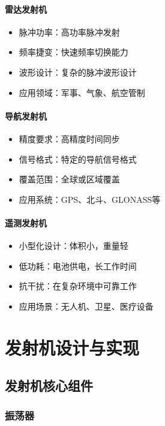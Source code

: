 \documentclass[12pt,UTF8]{ctexbook}
\begin{document}
\subsection{雷达发射机}
\begin{itemize}[leftmargin=3.5em]
    \item 脉冲功率：高功率脉冲发射
    \item 频率捷变：快速频率切换能力
    \item 波形设计：复杂的脉冲波形设计
    \item 应用领域：军事、气象、航空管制
\end{itemize}

\subsection{导航发射机}
\begin{itemize}[leftmargin=3.5em]
    \item 精度要求：高精度时间同步
    \item 信号格式：特定的导航信号格式
    \item 覆盖范围：全球或区域覆盖
    \item 应用系统：GPS、北斗、GLONASS等
\end{itemize}

\subsection{遥测发射机}
\begin{itemize}[leftmargin=3.5em]
    \item 小型化设计：体积小，重量轻
    \item 低功耗：电池供电，长工作时间
    \item 抗干扰：在复杂环境中可靠工作
    \item 应用场景：无人机、卫星、医疗设备
\end{itemize}

\part{发射机设计与实现}

\chapter{发射机核心组件}

\section{振荡器}
\end{document}
